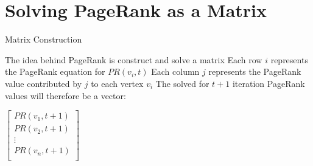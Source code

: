 \documentclass{beamer}
\begin{document}

\section{Solving PageRank as a Matrix}
\begin{frame}[t]{Matrix Construction}
\begin{outline}
    \1 The idea behind PageRank is construct and solve a matrix
    \1 Each row $i$ represents the PageRank equation for $PR(v_i, t)$ 
    \1 Each column $j$ represents the PageRank value contributed by $j$ to each vertex $v_i$
    \1 The solved for $t+1$ iteration PageRank values will therefore be a vector:
    \begin{center}
        \begin{math}
            \begin{bmatrix}
                PR(v_1, t+1)\\
                PR(v_2, t+1)\\
                \vdots\\
                PR(v_n, t+1)\\
            \end{bmatrix}
        \end{math}
    \end{center}
\end{outline}
\end{frame}
\end{document}
